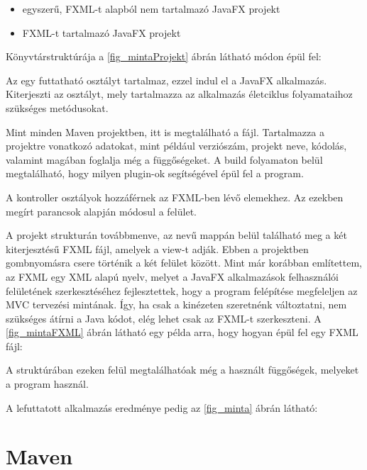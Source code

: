 \begin{itemize}
\item egyszerű, FXML-t alapból nem tartalmazó JavaFX projekt 
\item FXML-t tartalmazó JavaFX projekt 
\end{itemize}

Könyvtárstruktúrája a \ref{fig_mintaProjekt} ábrán látható módon épül fel: 



Az  egy futtatható osztályt tartalmaz, ezzel indul el a JavaFX alkalmazás.
Kiterjeszti az  osztályt, mely tartalmazza az alkalmazás életciklus folyamataihoz szükséges metódusokat.

Mint minden Maven projektben, itt is megtalálható a  fájl.
Tartalmazza a projektre vonatkozó adatokat, mint például verziószám, projekt neve, kódolás, valamint magában foglalja még a függőségeket.
A build folyamaton belül megtalálható, hogy milyen plugin-ok segítségével épül fel a program. 

A kontroller osztályok hozzáférnek az FXML-ben lévő elemekhez.
Az ezekben megírt parancsok alapján módosul a felület. 

A projekt strukturán továbbmenve, az  nevű mappán belül található meg a két  kiterjesztésű FXML fájl, amelyek a view-t adják.
Ebben a projektben gombnyomásra csere történik a két felület között.
Mint már korábban említettem, az FXML egy XML alapú nyelv, melyet a JavaFX alkalmazások felhasználói felületének szerkesztéséhez fejlesztettek, hogy a program felépítése megfeleljen az MVC tervezési mintának.
Így, ha csak a kinézeten szeretnénk változtatni, nem szükséges átírni a Java kódot, elég lehet csak az FXML-t szerkeszteni.
A \ref{fig_mintaFXML} ábrán látható egy példa arra, hogy hogyan épül fel egy FXML fájl: 


A struktúrában ezeken felül megtalálhatóak még a használt függőségek, melyeket a program használ. 

A lefuttatott alkalmazás eredménye pedig az \ref{fig_minta} ábrán látható:

%



\section{Maven}

